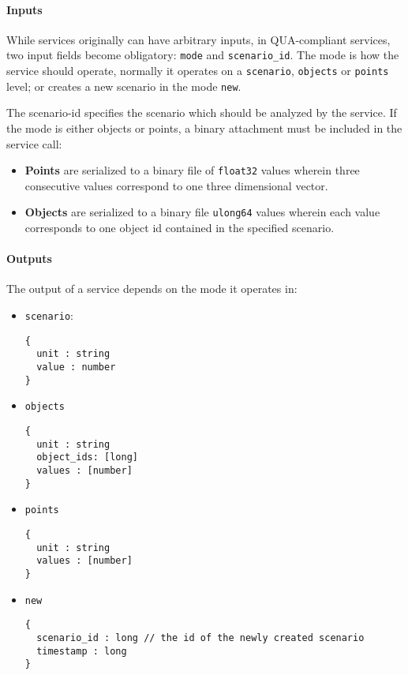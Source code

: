 \paragraph{Inputs}
While services originally can have arbitrary inputs, in QUA-compliant services, two input fields become obligatory: \texttt{mode} and \texttt{scenario\_id}. The mode is how the service should operate, normally it operates on a \texttt{scenario}, \texttt{objects} or \texttt{points} level; or creates a new scenario in the mode \texttt{new}.

The scenario-id specifies the scenario which should be analyzed by the service. If the mode is either objects or points, a binary attachment must be included in the service call:
\begin{itemize}
  \item \textbf{Points} are serialized to a binary file of \texttt{float32} values wherein three consecutive values correspond to one three dimensional vector.
  \item \textbf{Objects} are serialized to a binary file \texttt{ulong64} values wherein each value corresponds to one object id contained in the specified scenario.
\end{itemize}

\paragraph{Outputs}
The output of a service depends on the mode it operates in:

\begin{itemize}
  \item \texttt{scenario}:
  \begin{lstlisting}
{
  unit : string
  value : number
}
  \end{lstlisting}
  \item \texttt{objects}
  \begin{lstlisting}
{
  unit : string
  object_ids: [long]
  values : [number]
}
  \end{lstlisting}
  \item \texttt{points}
  \begin{lstlisting}
{
  unit : string
  values : [number]
}
  \end{lstlisting}
  \item \texttt{new}
  \begin{lstlisting}
{
  scenario_id : long // the id of the newly created scenario
  timestamp : long
}
  \end{lstlisting}
\end{itemize}

\clearpage
